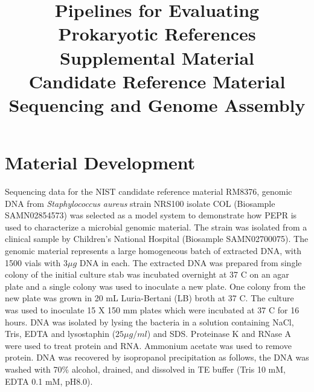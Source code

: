 \documentclass{article}\usepackage[]{graphicx}\usepackage[]{color}
\begin{document}
\title{
        Pipelines for Evaluating Prokaryotic References \\ 
        \large{Supplemental Material}\\
        Candidate Reference Material Sequencing and Genome Assembly
}
\maketitle

\section{Material Development}
Sequencing data for the NIST candidate reference material RM8376, genomic DNA from \emph{Staphylococcus aureus} strain NRS100 isolate COL (Biosample SAMN02854573) was selected as a model system to demonstrate how PEPR is used to characterize a microbial genomic material.  The strain was isolated from a clinical sample by Children's National Hospital (Biosample SAMN02700075). The genomic material represents a large homogeneous batch of extracted DNA, with 1500 vials with $3\mu g$ DNA in each.  The extracted DNA was prepared from single colony of the initial culture stab was incubated overnight at 37 \textdegree C on an agar plate and a single colony was used to inoculate a new plate. One colony from the new plate was grown in 20 mL Luria-Bertani (LB) broth at 37 \textdegree C. The culture was used to inoculate 15 X 150 mm plates which were incubated at 37 \textdegree C for 16 hours. DNA was isolated by lysing the bacteria in a solution containing NaCl, Tris, EDTA and lysostaphin ($25\mu g/ml$) and SDS. Proteinase K and RNase A were used to treat protein and RNA. Ammonium acetate was used to remove protein. DNA was recovered by isopropanol precipitation as follows, the DNA was washed with 70\% alcohol, drained, and dissolved in TE buffer (Tris 10 mM, EDTA 0.1 mM, pH8.0).
\end{document}
